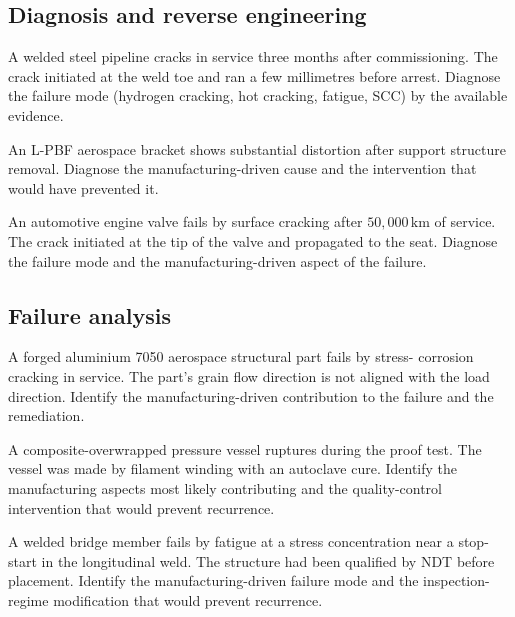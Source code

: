 \subsection*{Diagnosis and reverse engineering}

\begin{exercise}
A welded steel pipeline cracks in service three months after
commissioning. The crack initiated at the weld toe and ran a few
millimetres before arrest. Diagnose the failure mode (hydrogen
cracking, hot cracking, fatigue, SCC) by the available evidence.
\end{exercise}

\begin{exercise}
An L-PBF aerospace bracket shows substantial distortion after support
structure removal. Diagnose the manufacturing-driven cause and the
intervention that would have prevented it.
\end{exercise}

\begin{exercise}
An automotive engine valve fails by surface cracking after $50{,}000\,
\text{km}$ of service. The crack initiated at the tip of the valve
and propagated to the seat. Diagnose the failure mode and the
manufacturing-driven aspect of the failure.
\end{exercise}

\subsection*{Failure analysis}

\begin{exercise}
A forged aluminium 7050 aerospace structural part fails by stress-
corrosion cracking in service. The part's grain flow direction is
not aligned with the load direction. Identify the manufacturing-driven
contribution to the failure and the remediation.
\end{exercise}

\begin{exercise}
A composite-overwrapped pressure vessel ruptures during the proof
test. The vessel was made by filament winding with an autoclave cure.
Identify the manufacturing aspects most likely contributing and the
quality-control intervention that would prevent recurrence.
\end{exercise}

\begin{exercise}
A welded bridge member fails by fatigue at a stress concentration
near a stop-start in the longitudinal weld. The structure had been
qualified by NDT before placement. Identify the manufacturing-driven
failure mode and the inspection-regime modification that would
prevent recurrence.
\end{exercise}


